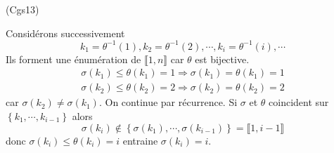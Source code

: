 \begin{tiny}(Cgs13)\end{tiny} Considérons successivement
\[
  k_1=\theta^{-1}(1), k_2=\theta^{-1}(2), \cdots , k_i=\theta^{-1}(i), \cdots
\]
Ils forment une énumération de $\llbracket 1,n \rrbracket$ car $\theta$ est bijective.
\begin{multline*}
  \sigma(k_1) \leq \theta(k_1)= 1 \Rightarrow \sigma(k_1) = \theta(k_1)= 1 \\
  \sigma(k_2) \leq \theta(k_2)= 2 \Rightarrow \sigma(k_2) = \theta(k_2)= 2
\end{multline*}
car $\sigma(k_2) \neq \sigma(k_1)$.\newline
On continue par récurrence.\newline
Si $\sigma$ et $\theta$ coincident sur $\left\lbrace k_1, \cdots, k_{i-1} \right\rbrace$ alors 
\[
  \sigma(k_i) \notin \left\lbrace \sigma(k_1), \cdots, \sigma(k_{i-1})\right\rbrace = \llbracket 1, i-1 \rrbracket 
\]
donc $\sigma(k_i)\leq \theta(k_i)=i$ entraine $\sigma(k_i) = i$.
